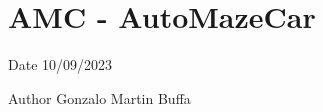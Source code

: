 \chapter{AMC -\/ Auto\+Maze\+Car}
\hypertarget{index}{}\label{index}
\begin{DoxyDate}{Date}
10/09/2023 
\end{DoxyDate}
\begin{DoxyAuthor}{Author}
Gonzalo Martin Buffa 
\end{DoxyAuthor}
